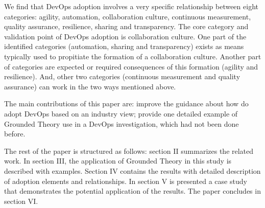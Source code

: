 We find that DevOps adoption involves a very specific relationship between eight categories: agility, automation, collaboration culture, continuous measurement, quality assurance, resilience, sharing and transparency. The core category and validation point of DevOps adoption is collaboration culture. One part of the identified categories (automation, sharing and transparency) exists as means typically used to propitiate the formation of a collaboration culture. Another part of categories are expected or required consequences of this formation (agility and resilience). And, other two categories (continuous measurement and quality assurance) can work in the two ways mentioned above.

The main contributions of this paper are: improve the guidance about how do adopt DevOps based on an industry view; provide one detailed example of Grounded Theory use in a DevOps investigation, which had not been done before.

The rest of the paper is structured as follows: section II summarizes the
related work. In section III, the application of Grounded Theory in this study
is described with examples. Section IV contains the results with detailed
description of adoption elements and relationships. In section V is presented
a case study that demonstrates the potential application of the results. The
paper concludes in section VI.
